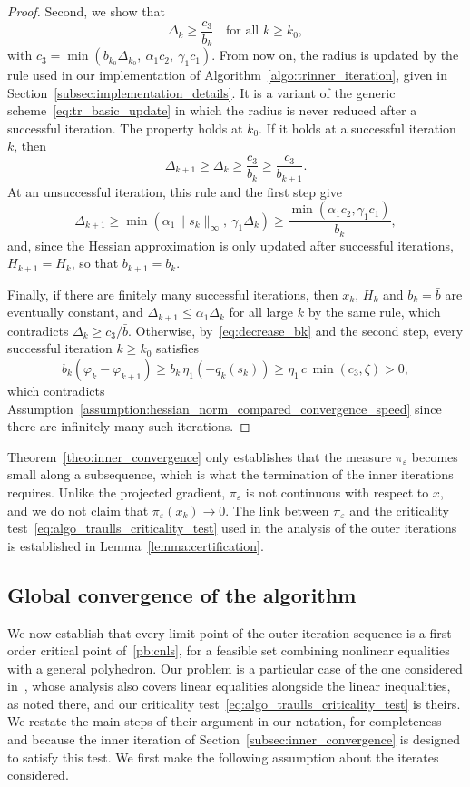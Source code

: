 \documentclass[pdflatex,sn-mathphys-num]{sn-jnl}%
\theoremstyle{thmstyleone}%
\begin{document}
\begin{proof}
	Second, we show that
	\[\Delta_k \ge \frac{c_3}{b_k} \quad \text{for all } k \ge k_0,\]
	with $c_3 = \min\left(b_{k_0}\Delta_{k_0},\ \alpha_1c_2,\ \gamma_1c_1\right)$.
	From now on, the radius is updated by the rule used in our implementation of Algorithm~\ref{algo:trinner_iteration}, given in Section~\ref{subsec:implementation_details}. It is a variant of the generic scheme~\eqref{eq:tr_basic_update} in which the radius is never reduced after a successful iteration. The property holds at $k_0$. If it holds at a successful iteration $k$, then
	\[\Delta_{k+1} \ge \Delta_k \ge \frac{c_3}{b_k} \ge \frac{c_3}{b_{k+1}}.\]
	At an unsuccessful iteration, this rule and the first step give
	\[\Delta_{k+1} \ge \min\left(\alpha_1\|s_k\|_\infty,\ \gamma_1\Delta_k\right) \ge \frac{\min(\alpha_1c_2,\gamma_1c_1)}{b_k},\]
	and, since the Hessian approximation is only updated after successful iterations, $H_{k+1} = H_k$, so that $b_{k+1} = b_k$.

	Finally, if there are finitely many successful iterations, then $x_k$, $H_k$ and $b_k = \bar{b}$ are eventually constant, and $\Delta_{k+1} \le \alpha_1\Delta_k$ for all large $k$ by the same rule, which contradicts $\Delta_k \ge c_3/\bar{b}$. Otherwise, by~\eqref{eq:decrease_bk} and the second step, every successful iteration $k \ge k_0$ satisfies
	\[b_k\left(\varphi_k - \varphi_{k+1}\right) \ge b_k\,\eta_1\left(-q_k(s_k)\right) \ge \eta_1\,c\,\min(c_3,\zeta) > 0,\]
	which contradicts Assumption~\ref{assumption:hessian_norm_compared_convergence_speed} since there are infinitely many such iterations.
\end{proof}
Theorem~\ref{theo:inner_convergence} only establishes that the measure $\pi_\varepsilon$ becomes small along a subsequence, which is what the termination of the inner iterations requires. Unlike the projected gradient, $\pi_\varepsilon$ is not continuous with respect to $x$, and we do not claim that $\pi_\varepsilon(x_k) \to 0$. The link between $\pi_\varepsilon$ and the criticality test~\eqref{eq:algo_traulls_criticality_test} used in the analysis of the outer iterations is established in Lemma~\ref{lemma:certification}.

\subsection{Global convergence of the algorithm}\label{subsec:outer_convergence}

We now establish that every limit point of the outer iteration sequence is a first-order critical point of~\eqref{pb:cnls}, for a feasible set combining nonlinear equalities with a general polyhedron. Our problem is a particular case of the one considered in~\cite{conn-etal:1996b}, whose analysis also covers linear equalities alongside the linear inequalities, as noted there, and our criticality test~\eqref{eq:algo_traulls_criticality_test} is theirs. We restate the main steps of their argument in our notation, for completeness and because the inner iteration of Section~\ref{subsec:inner_convergence} is designed to satisfy this test. 
We first make the following assumption about the iterates considered.
\end{document}
